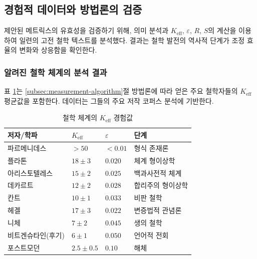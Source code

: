 \documentclass[11pt,a4paper]{article}
\newcommand{\eps}{\varepsilon}
\begin{document}
	\subsection{경험적 데이터와 방법론의 검증}
	\label{subsec:empirical-validation}
	
	제안된 메트릭스의 유효성을 검증하기 위해, 의미 분석과 \(K_{\mathrm{eff}}\), \(\eps\), \(R\), \(S\)의 계산을 이용하여 일련의 고전 철학 텍스트를 분석했다. 결과는 철학 발전의 역사적 단계가 조정 효율의 변화와 상응함을 확인한다.
	
	\subsubsection{알려진 철학 체계의 분석 결과}
	
	표 \ref{tab:empirical-keff}는 \ref{subsec:measurement-algorithm}절 방법론에 따라 얻은 주요 철학자들의 \(K_{\mathrm{eff}}\) 평균값을 포함한다. 데이터는 그들의 주요 저작 코퍼스 분석에 기반한다.
	
	\begin{table}[H]
		\centering
		\caption{철학 체계의 \(K_{\mathrm{eff}}\) 경험값}
		\label{tab:empirical-keff}
		\begin{tabular}{p{3cm}p{2cm}p{2.5cm}p{3cm}}
			\toprule
			\textbf{저자/학파} & \(K_{\mathrm{eff}}\) & \(\eps\) & \textbf{단계} \\
			\midrule
			파르메니데스 & \(>50\) & \(<0.01\) & 형식 존재론 \\
			플라톤 & \(18 \pm 3\) & \(0.020\) & 체계 형이상학 \\
			아리스토텔레스 & \(15 \pm 2\) & \(0.025\) & 백과사전적 체계 \\
			데카르트 & \(12 \pm 2\) & \(0.028\) & 합리주의 형이상학 \\
			칸트 & \(10 \pm 1\) & \(0.033\) & 비판 철학 \\
			헤겔 & \(17 \pm 3\) & \(0.022\) & 변증법적 관념론 \\
			니체 & \(7 \pm 2\) & \(0.045\) & 생의 철학 \\
			비트겐슈타인(후기) & \(6 \pm 1\) & \(0.050\) & 언어적 전회 \\
			포스트모던 & \(2.5 \pm 0.5\) & \(0.10\) & 해체 \\
			\bottomrule
		\end{tabular}
	\end{table}
	
\end{document}
